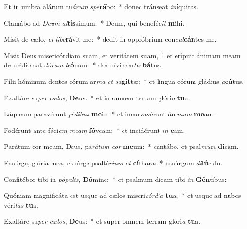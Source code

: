 \item Et in umbra alárum tu\textit{á}\textit{rum} \textit{spe}\textbf{rá}bo:~* donec tránseat \textit{in}\textbf{í}quitas.
\item Clamábo ad \textit{De}\textit{um} \textit{al}\textbf{tís}simum:~* Deum, qui benefé\textit{cit} \textbf{mi}hi.
\item Misit de cælo, \textit{et} \textit{li}\textit{be}\textbf{rá}vit me:~* dedit in oppróbrium con\textit{cul}\textbf{cán}tes me.
\item Misit Deus misericórdiam suam, et veritátem suam,~† et erípuit ánimam meam de médio catu\textit{ló}\textit{rum} \textit{le}\textbf{ó}num:~* dormívi con\textit{tur}\textbf{bá}tus.
\item Fílii hóminum dentes eórum ar\textit{ma} \textit{et} \textit{sa}\textbf{gít}tæ:~* et lingua eórum gládius \textit{a}\textbf{cú}tus.
\item Exaltáre su\textit{per} \textit{cæ}\textit{los}, \textbf{De}us:~* et in omnem terram glóri\textit{a} \textbf{tu}a.
\item Láqueum paravérunt \textit{pé}\textit{di}\textit{bus} \textbf{me}is:~* et incurvavérunt áni\textit{mam} \textbf{me}am.
\item Fodérunt ante fáci\textit{em} \textit{me}\textit{am} \textbf{fó}veam:~* et incidérunt \textit{in} \textbf{e}am.
\item Parátum cor meum, Deus, pa\textit{rá}\textit{tum} \textit{cor} \textbf{me}um:~* cantábo, et psal\textit{mum} \textbf{di}cam.
\item Exsúrge, glória mea, exsúrge psalté\textit{ri}\textit{um} \textit{et} \textbf{cí}thara:~* exsúrgam \textit{di}\textbf{lú}culo.
\item Confitébor tibi in \textit{pó}\textit{pu}\textit{lis}, \textbf{Dó}mine:~* et psalmum dicam tibi \textit{in} \textbf{Gén}tibus:
\item Quóniam magnificáta est usque ad cælos miseri\textit{cór}\textit{di}\textit{a} \textbf{tu}a,~* et usque ad nubes véri\textit{tas} \textbf{tu}a.
\item Exaltáre su\textit{per} \textit{cæ}\textit{los}, \textbf{De}us:~* et super omnem terram glóri\textit{a} \textbf{tu}a.
